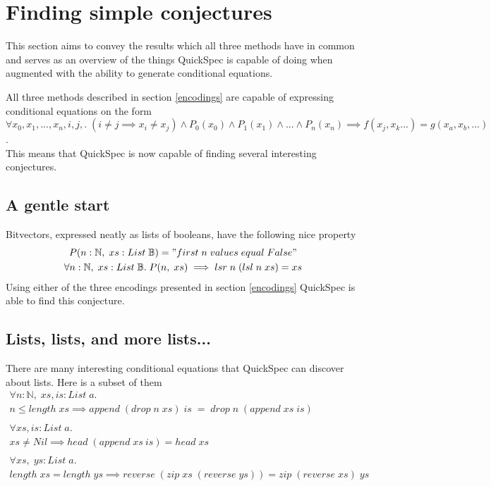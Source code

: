 \section{Finding simple conjectures}

This section aims to convey the results which
all three methods have in common and serves as an overview
of the things QuickSpec is capable of doing when augmented with
the ability to generate conditional equations.

All three methods described in section \ref{encodings}
are capable of expressing conditional equations on the form
\\$\forall x_0, x_1, ..., x_n, i, j,.\;(i \neq j \implies x_i \neq x_j)\wedge P_0(x_0) \wedge P_1(x_1) \wedge ... \wedge P_n(x_n) \implies f(x_j, x_k ...) = g(x_a, x_b, ...)$.\\
This means that QuickSpec is now capable of finding several
interesting conjectures.

\subsection{A gentle start} \label{bitvector}
    Bitvectors, expressed neatly as lists of booleans,
    have the following nice property
    \begin{gather*}
        P(n:\mathbb{N},\;xs:List\;\mathbb{B}) = "first\;n\;values\;equal\;False"\\
        \forall n:\mathbb{N},\;xs:List\;\mathbb{B}.\;P(n,\;xs)\implies lsr\;n\;(lsl\;n\;xs)=xs
    \end{gather*}
    Using either of the three encodings presented in section \ref{encodings} QuickSpec
    is able to find this conjecture.

\subsection{Lists, lists, and more lists...}
    There are many interesting conditional equations that
    QuickSpec can discover about lists. Here is a subset of them
    \begin{gather*}
        \forall n:\mathbb{N},\; xs, is:List\; a.\\
        n \leq length\; xs \implies append\; (drop\; n\; xs)\; is\; =\; drop\; n\; (append\; xs\; is)\\\\
        \forall xs, is:List\; a.\\
        xs \neq Nil \implies head\; (append\; xs\: is) = head\; xs\\\\
        \forall xs,\; ys:List\; a.\\
        length\; xs = length\; ys \implies reverse\; (zip\; xs\; (reverse\; ys)) = zip\; (reverse\; xs)\; ys
    \end{gather*}

